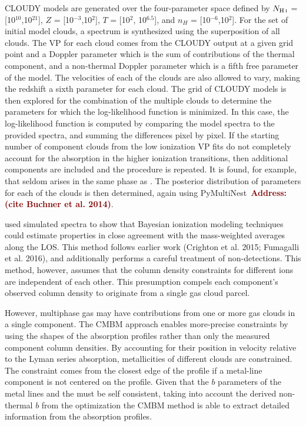 \documentclass[fleqn,usenatbib]{mnras}
\newcommand{\todo}[1]{\textcolor{Maroon}{\textbf{Address: #1}}}
\begin{document}
CLOUDY models are generated over the four-parameter space defined by $N_{\ion{H}{I}}$ = [10$^{10}$,10$^{21}$], $Z$ = [10$^{-3}$,10$^{2}$], $T$ = [10$^{2}$, 10$^{6.5}$], and $n_H$ = [10$^{-6}$,10$^{2}$].
For the set of initial model clouds, a spectrum is synthesized using the superposition of all clouds.
The VP for each cloud comes from the CLOUDY output at a given grid point and a Doppler parameter which is the sum of contributions of the thermal component, and a non-thermal Doppler parameter which is a fifth free parameter of the model.
The velocities of each of the clouds are also allowed to vary, making the redshift a sixth parameter for each cloud.
The grid of CLOUDY models is then explored for the combination of the multiple clouds to determine the parameters for which the log-likelihood function is minimized.
In this case, the log-likelihood function is computed by comparing the model spectra to the provided spectra, and summing the differences pixel by pixel.
If the starting number of component clouds from the low ionization VP fits do not completely account for the absorption in the higher ionization transitions, then additional components are included and the procedure is repeated.
It is found, for example, that  seldom arises in the same phase as .
The posterior distribution of parameters for each of the clouds is then determined, again using PyMultiNest~\todo{(cite Buchner et al. 2014)}.

\cite{Liang2018} used simulated spectra to show that Bayesian ionization modeling techniques could estimate properties in close agreement with the  mass-weighted averages along the LOS.
This method follows earlier work (Crighton et al. 2015; Fumagalli et al. 2016), and additionally performs a careful treatment of non-detections.
This method, however, assumes that the column density constraints for different ions are independent of each other.
This presumption compels each component's observed column density to originate from a single gas cloud parcel.

However, multiphase gas may have contributions from one or more gas clouds in a single component.
The CMBM approach enables more-precise constraints by using the shapes of the absorption profiles rather than only the measured component column densities.
By accounting for their position in velocity relative to the Lyman series absorption, metallicities of different clouds are constrained.
The constraint comes from the closest edge of the  profile if a metal-line component is not centered on the  profile.
Given that the $b$ parameters of the metal lines and the  must be self consistent, taking into account the derived non-thermal $b$ from the optimization the CMBM method is able to extract detailed information from the absorption profiles.
\end{document}
